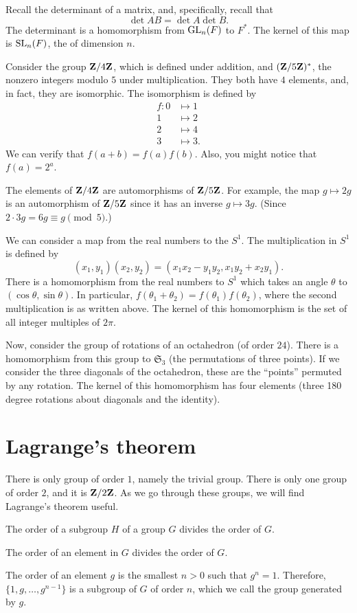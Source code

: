 \documentclass[11pt, twoside]{amsart}
\begin{document}
Recall the determinant of a matrix, and, specifically, recall that
$$
\det AB = \det A \det B. 
$$
The determinant is a homomorphism from $\operatorname{GL}_n(F)$ to $F^*$. The kernel of this map is $\operatorname{SL}_n(F)$, the  of dimension $n$.

Consider the group $\mathbf{Z}/4\mathbf{Z}$, which is defined under addition, and $(\mathbf{Z}/5\mathbf{Z})^*$, the nonzero integers modulo $5$ under multiplication. They both have $4$ elements, and, in fact, they are isomorphic. The isomorphism is defined by
\begin{align*}
f: 0 &\mapsto 1\\
1&\mapsto 2\\
2&\mapsto 4\\
3&\mapsto 3.
\end{align*}
We can verify that $f(a+b) = f(a)f(b)$. Also, you might notice that $f(a) = 2^a$.

The elements of $\mathbf{Z}/4\mathbf{Z}$ are automorphisms of $\mathbf{Z}/5\mathbf{Z}$. For example, the map $g\mapsto 2g$ is an automorphism of $\mathbf{Z}/5\mathbf{Z}$ since it has an inverse $g\mapsto 3g$. (Since $2\cdot 3g = 6g \equiv g \pmod 5$.)

We can consider a map from the real numbers to the  $S^1$. The multiplication in $S^1$ is defined by 
$$
(x_1,y_1)(x_2,y_2) = (x_1x_2 - y_1y_2, x_1y_2 + x_2y_1).
$$
There is a homomorphism from the real numbers to $S^1$ which takes an angle $\theta$ to $(\cos \theta, \sin \theta)$. In particular, $f(\theta_1 + \theta_2) = f(\theta_1) f(\theta_2)$, where the second multiplication is as written above. The kernel of this homomorphism is the set of all integer multiples of $2\pi$.

Now, consider the group of rotations of an octahedron (of order $24$). There is a homomorphism from this group to $\mathfrak{S}_3$ (the permutations of three points). If we consider the three diagonals of the octahedron, these are the ``points'' permuted by any rotation. The kernel of this homomorphism has four elements (three 180 degree rotations about diagonals and the identity).

\section{Lagrange's theorem}
There is only group of order $1$, namely the trivial group. There is only one group of order $2$, and it is $\mathbf{Z}/2\mathbf{Z}$. As we go through these groups, we will find Lagrange's theorem useful.
\begin{theorem}
[Lagrange]\label{lagrange} The order of a subgroup $H$ of a group $G$ divides the order of $G$. 
\end{theorem}
\begin{corollary}
The order of an element in $G$ divides the order of $G$.
\end{corollary}
The order of an element $g$ is the smallest $n> 0$ such that $g^n = 1$. Therefore, $\{1,g, \hdots, g^{n-1}\}$ is a subgroup of $G$ of order $n$, which we call the group generated by $g$.
\end{document}
